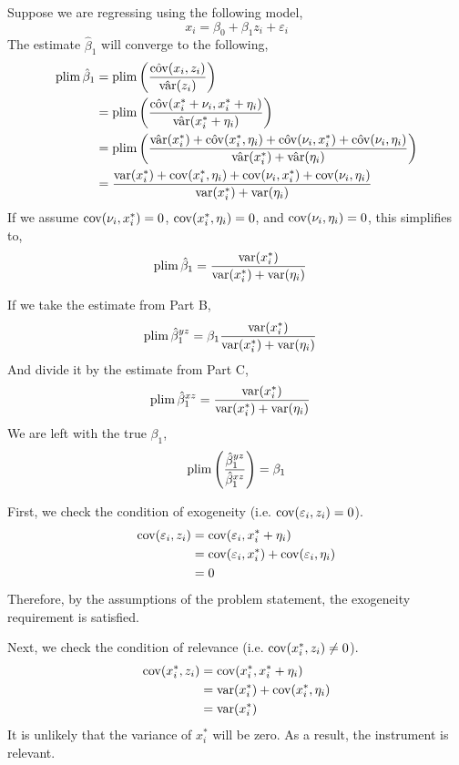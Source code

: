 \documentclass[12pt,twoside]{article}
\begin{document}
\begin{problems}
\begin{problemparts}
Suppose we are regressing using the following model,
$$ x_i = \beta_0 + \beta_1 z_i + \varepsilon_i $$
The estimate $\hat{\beta}_1$ will converge to the following,
\begin{align*}
    \operatorname{plim} \hat{\beta}_1 &= \operatorname{plim} \left(\frac{\hat{\operatorname{cov}}(x_i,
    z_i)}{\hat{\operatorname{var}}(z_i)}\right) \\
    &= \operatorname{plim} \left(\frac{\hat{\operatorname{cov}}(x_i^* + \nu_i, x_i^* +
    \eta_i)}{\hat{\operatorname{var}}(x_i^* + \eta_i)}\right) \\
    &= \operatorname{plim} \left(\frac{\hat{\operatorname{var}}(x_i^*) + \hat{\operatorname{cov}}(x_i^*, \eta_i) +
    \hat{\operatorname{cov}}(\nu_i, x_i^*) + \hat{\operatorname{cov}}(\nu_i, \eta_i)}{\hat{\operatorname{var}}(x_i^*) +
    \hat{\operatorname{var}}(\eta_i)}\right) \\
    &= \frac{\operatorname{var}(x_i^*) + \operatorname{cov}(x_i^*, \eta_i) +
    \operatorname{cov}(\nu_i, x_i^*) + \operatorname{cov}(\nu_i, \eta_i)}{\operatorname{var}(x_i^*) +
    \operatorname{var}(\eta_i)}
\end{align*}
If we assume $\operatorname{cov}(\nu_i, x_i^*) = 0$, $\operatorname{cov}(x_i^*, \eta_i) = 0$, and
$\operatorname{cov}(\nu_i, \eta_i) = 0$, this simplifies to,
\begin{align*}
    \operatorname{plim} \hat{\beta}_1 &= \frac{\operatorname{var}(x_i^*)}{\operatorname{var}(x_i^*) + \operatorname{var}(\eta_i)}
\end{align*}

\problempart %

If we take the estimate from Part B,
\begin{align*}
    \operatorname{plim} \hat{\beta}_1^{yz} &= \beta_1 \frac{\operatorname{var}(x_i^*)}{\operatorname{var}(x_i^*) +
    \operatorname{var}(\eta_i)}
\end{align*}
And divide it by the estimate from Part C,
\begin{align*}
    \operatorname{plim} \hat{\beta}_1^{xz} &= \frac{\operatorname{var}(x_i^*)}{\operatorname{var}(x_i^*) + \operatorname{var}(\eta_i)}
\end{align*}
We are left with the true $\beta_1$,
$$\operatorname{plim} \left(\frac{\hat{\beta}_1^{yz}}{\hat{\beta}_1^{xz}}\right) = \beta_1 $$

\problempart %

First, we check the condition of exogeneity (i.e. $\operatorname{cov} (\varepsilon_i, z_i)
= 0$).
\begin{align*}
    \operatorname{cov} (\varepsilon_i, z_i) &= \operatorname{cov}(\varepsilon_i, x_i^* + \eta_i) \\
    &= \operatorname{cov}(\varepsilon_i, x_i^*) + \operatorname{cov}(\varepsilon_i, \eta_i) \\
    &= 0
\end{align*}
Therefore, by the assumptions of the problem statement, the exogeneity
requirement is satisfied.

Next, we check the condition of relevance (i.e. $\operatorname{cov}(x_i^*, z_i) \neq 0$).
\begin{align*}
    \operatorname{cov} (x_i^*, z_i) &= \operatorname{cov}(x_i^*, x_i^* + \eta_i) \\
    &= \operatorname{var}(x_i^*) + \operatorname{cov}(x_i^*, \eta_i) \\
    &= \operatorname{var}(x_i^*)
\end{align*}
It is unlikely that the variance of $x_i^*$ will be zero. As a result, the
instrument is relevant.


\end{problemparts}
\end{problems}
\end{document}
